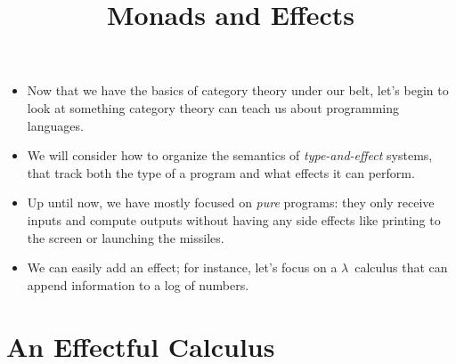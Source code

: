 \documentclass{lecturenotes}
\title{Monads and Effects}
\begin{document}
\maketitle

\begin{itemize}
\item Now that we have the basics of category theory under our belt, let's begin to look at something category theory can teach us about programming languages.
\item We will consider how to organize the semantics of \emph{type-and-effect} systems, that track both the type of a program and what effects it can perform.
\item Up until now, we have mostly focused on \emph{pure} programs: they only receive inputs and compute outputs without having any side effects like printing to the screen or launching the missiles.
\item We can easily add an effect; for instance, let's focus on a $\lambda$~calculus that can append information to a log of numbers.
\end{itemize}

\section*{An Effectful Calculus}
\end{document}
